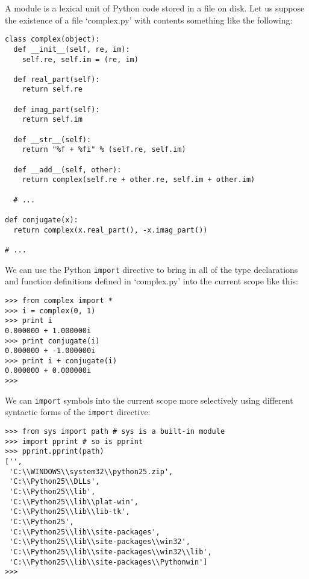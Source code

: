 A module is a lexical unit of Python code stored in a file on
disk. Let us suppose the existence of a file `complex.py' with
contents something like the following:
\begin{verbatim}
class complex(object):
  def __init__(self, re, im):
    self.re, self.im = (re, im)

  def real_part(self):
    return self.re

  def imag_part(self):
    return self.im

  def __str__(self):
    return "%f + %fi" % (self.re, self.im)

  def __add__(self, other):
    return complex(self.re + other.re, self.im + other.im)

  # ...

def conjugate(x):
  return complex(x.real_part(), -x.imag_part())

# ...
\end{verbatim}
We can use the Python \verb|import| directive to bring in all of the
type declarations and function definitions defined in `complex.py'
into the current scope like this:
\begin{verbatim}
>>> from complex import *
>>> i = complex(0, 1)
>>> print i
0.000000 + 1.000000i
>>> print conjugate(i)
0.000000 + -1.000000i
>>> print i + conjugate(i)
0.000000 + 0.000000i
>>>
\end{verbatim}
We can \verb|import| symbols into the current scope more selectively using
different syntactic forms of the \verb|import| directive:
\begin{verbatim}
>>> from sys import path # sys is a built-in module
>>> import pprint # so is pprint
>>> pprint.pprint(path)
['',
 'C:\\WINDOWS\\system32\\python25.zip',
 'C:\\Python25\\DLLs',
 'C:\\Python25\\lib',
 'C:\\Python25\\lib\\plat-win',
 'C:\\Python25\\lib\\lib-tk',
 'C:\\Python25',
 'C:\\Python25\\lib\\site-packages',
 'C:\\Python25\\lib\\site-packages\\win32',
 'C:\\Python25\\lib\\site-packages\\win32\\lib',
 'C:\\Python25\\lib\\site-packages\\Pythonwin']
>>> \end{verbatim}
